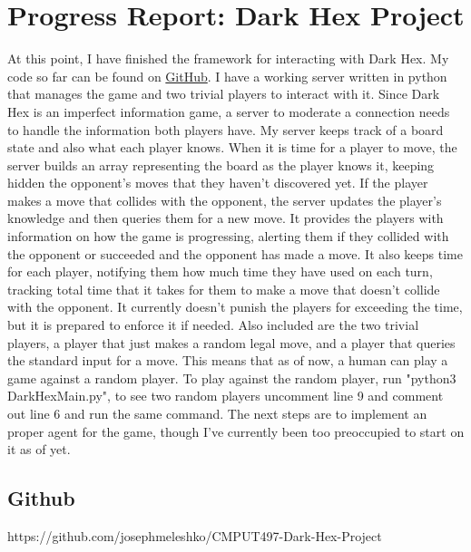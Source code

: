 \documentclass[11pt]{article}
\begin{document}
\section*{Progress Report: Dark Hex Project}

At this point, I have finished the framework for interacting with Dark Hex.
My code so far can be found on \href{https://github.com/josephmeleshko/CMPUT497-Dark-Hex-Project}{GitHub}.
I have a working server written in python that manages the game and two trivial players to interact with it.
Since Dark Hex is an imperfect information game, a server to moderate a connection needs to handle the information both players have.
My server keeps track of a board state and also what each player knows.
When it is time for a player to move, the server builds an array representing the board as the player knows it,
keeping hidden the opponent's moves that they haven't discovered yet.
If the player makes a move that collides with the opponent, the server updates the player's knowledge and then queries them for a new move.
It provides the players with information on how the game is progressing,
alerting them if they collided with the opponent or succeeded and the opponent has made a move.
It also keeps time for each player, notifying them how much time they have used on each turn,
tracking total time that it takes for them to make a move that doesn't collide with the opponent.
It currently doesn't punish the players for exceeding the time, but it is prepared to enforce it if needed.
Also included are the two trivial players, a player that just makes a random legal move, and a player that queries the standard input for a move.
This means that as of now, a human can play a game against a random player.
To play against the random player, run "python3 DarkHexMain.py", to see two random players uncomment line 9 and comment out line 6 and run the same command.
The next steps are to implement an proper agent for the game, though I've currently been too preoccupied to start on it as of yet.

\subsection*{Github}
https://github.com/josephmeleshko/CMPUT497-Dark-Hex-Project
\end{document}
